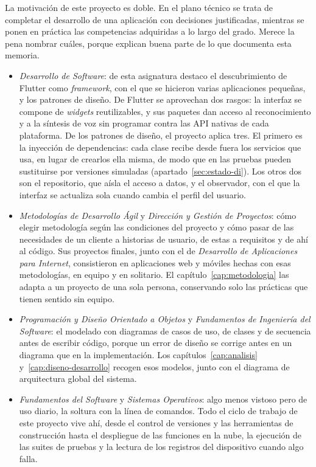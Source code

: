 La motivación de este proyecto es doble. En el plano técnico se trata de completar el desarrollo de una aplicación con decisiones justificadas, mientras se ponen en práctica las competencias adquiridas a lo largo del grado. Merece la pena nombrar cuáles, porque explican buena parte de lo que documenta esta memoria.
\begin{itemize}
    
    \item \textit{Desarrollo de Software}: de esta asignatura destaco el descubrimiento de Flutter como \emph{framework}, con el que se hicieron varias aplicaciones pequeñas, y los patrones de diseño. De Flutter se aprovechan dos rasgos: la interfaz se compone de \emph{widgets} reutilizables, y sus paquetes dan acceso al reconocimiento y a la síntesis de voz sin programar contra las API nativas de cada plataforma. De los patrones de diseño, el proyecto aplica tres. El primero es la inyección de dependencias: cada clase recibe desde fuera los servicios que usa, en lugar de crearlos ella misma, de modo que en las pruebas pueden sustituirse por versiones simuladas (apartado~\ref{sec:estado-di}). Los otros dos son el repositorio, que aísla el acceso a datos, y el observador, con el que la interfaz se actualiza sola cuando cambia el perfil del usuario.

    \item \textit{Metodologías de Desarrollo Ágil} y \textit{Dirección y Gestión de Proyectos}: cómo elegir metodología según las condiciones del proyecto y cómo pasar de las necesidades de un cliente a historias de usuario, de estas a requisitos y de ahí al código. Sus proyectos finales, junto con el de \textit{Desarrollo de Aplicaciones para Internet}, consistieron en aplicaciones web y móviles hechas con esas metodologías, en equipo y en solitario. El capítulo~\ref{cap:metodologia} las adapta a un proyecto de una sola persona, conservando solo las prácticas que tienen sentido sin equipo. 

    \item \textit{Programación y Diseño Orientado a Objetos} y \textit{Fundamentos de Ingeniería del Software}: el modelado con diagramas de casos de uso, de clases y de secuencia antes de escribir código, porque un error de diseño se corrige antes en un diagrama que en la implementación. Los capítulos~\ref{cap:analisis} y~\ref{cap:diseno-desarrollo} recogen esos modelos, junto con el diagrama de arquitectura global del sistema.

    \item \textit{Fundamentos del Software} y \textit{Sistemas Operativos}: algo menos vistoso pero de uso diario, la soltura con la línea de comandos. Todo el ciclo de trabajo de este proyecto vive ahí, desde el control de versiones y las herramientas de construcción hasta el despliegue de las funciones en la nube, la ejecución de las suites de pruebas y la lectura de los registros del dispositivo cuando algo falla.

\end{itemize}

